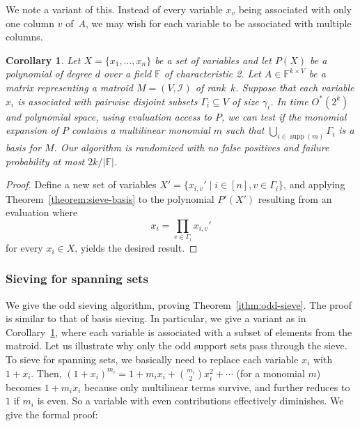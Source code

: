 \documentclass[10pt,a4paper]{article}
\newtheorem{corollary}{Corollary}[section]
\newcommand{\F}{\ensuremath{\mathbb F}\xspace}
\newcommand{\cI}{\ensuremath{\mathcal I}\xspace}
\DeclareMathOperator{\supp}{supp}
\begin{document}
We note a variant of this. Instead of every variable $x_v$ being associated with
only one column $v$ of~$A$, we may wish for each variable to be associated with
multiple columns. 

\begin{corollary} \label{cor:basis}
  Let $X=\{x_1,\ldots,x_n\}$ be a set of variables and 
  let $P(X)$ be a polynomial of degree $d$ over a field $\F$ of characteristic 2.
  Let $A \in \F^{k \times V}$ be a matrix representing a matroid $M=(V, \cI)$ of rank~$k$. 
  Suppose that each variable $x_i$ is associated with pairwise disjoint subsets $\Gamma_i \subseteq V$ of size $\gamma_i$.
  In time $O^*(2^k)$ and polynomial space, using evaluation access to $P$, 
  we can test if the monomial expansion of $P$ contains a multilinear monomial
  $m$ such that $\bigcup_{i \in \supp(m)} \Gamma_i$ is a basis for $M$. Our algorithm is randomized with no false
  positives and failure probability at most $2k/|\F|$.
\end{corollary}
\begin{proof}
  Define a new set of variables $X' = \{ x_{i,v}' \mid i \in [n], v \in \Gamma_i \}$, and
  applying Theorem~\ref{theorem:sieve-basis} to the polynomial $P'(X')$
  resulting from an evaluation where
  \[
    x_i = \prod_{v \in \Gamma_i} x_{i,v}'
  \]
  for every $x_i \in X$, yields the desired result.
\end{proof}

\subsubsection{Sieving for spanning sets} \label{sec:odd-sieve}

We give the odd sieving algorithm, proving Theorem~\ref{ithm:odd-sieve}.
The proof is similar to that of basis sieving.
In particular, we give a variant as in Corollary~\ref{cor:basis}, where each variable is associated with a subset of elements from the matroid.
Let us illustrate why only the odd support sets pass through the sieve.
To sieve for spanning sets, we basically need to replace each variable $x_i$ with $1 + x_i$.
Then, $(1 + x_i)^{m_i} = 1 + m_i x_i + \binom{m_i}{2} x_i^2 + \cdots$ (for a monomial $m$) becomes $1 + m_i x_i$ because only multilinear terms survive, and further reduces to $1$ if $m_i$ is even.  
So a variable with even contributions effectively diminishes.
We give the formal proof:
\end{document}
